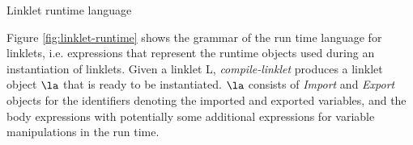 			\begin{figure-here}
				\begin{todo}
					Linklet runtime language
				\end{todo}


			\end{figure-here}


			\begin{paragraph-here}
				Figure \ref{fig:linklet-runtime} shows the grammar of the run\dash
				time language for linklets, i.e. expressions that represent the
				run\dash time objects used during an instantiation of linklets. Given a
				linklet L, \emph{compile-linklet} produces a linklet object $\la$ that
				is ready to be instantiated. $\la$ consists of \emph{Import} and
				\emph{Export} objects for the identifiers denoting the imported and
				exported variables, and the body expressions with potentially some
				additional expressions for variable manipulations in the run\dash
				time.
			\end{paragraph-here}


